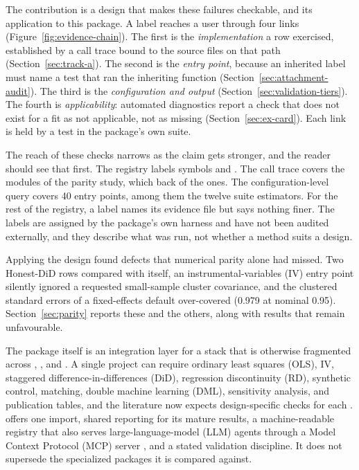 The contribution is a design that makes these failures checkable, and
its application to this package. A label reaches a user through four
links (Figure~\ref{fig:evidence-chain}). The first is the
\emph{implementation} a row exercised, established by a call trace bound
to the source files on that path (Section~\ref{sec:track-a}). The second
is the \emph{entry point}, because an inherited label must name a test
that ran the inheriting function (Section~\ref{sec:attachment-audit}).
The third is the \emph{configuration and output}
(Section~\ref{sec:validation-tiers}). The fourth is
\emph{applicability}: automated diagnostics report a check that does not
exist for a fit as not applicable, not as missing
(Section~\ref{sec:ex-card}). Each link is held by a test in the package's
own suite.

The reach of these checks narrows as the claim gets stronger, and the
reader should see that first. The registry labels
\RegistryCertified{} symbols  and \RegistryValidated{}
. The call trace covers the \RParityModuleCount{} modules
of the parity study, which back \ParityTrackACertifiedCount{} of the
 ones. The configuration-level query covers 40 entry points, among them the twelve suite estimators. For the
rest of the registry, a label names its evidence file but says nothing
finer. The labels are assigned by the package's own harness and have not been
audited externally, and they describe what was run, not whether a method
suits a design.

Applying the design found defects that numerical parity alone had
missed. Two Honest-DiD rows compared  with itself, an
instrumental-variables (IV) entry point silently ignored a requested
small-sample cluster covariance, and the clustered standard errors of a
fixed-effects default over-covered (0.979 at nominal 0.95).
Section~\ref{sec:parity} reports these and the others, along with
results that remain unfavourable.

The package itself is an integration layer for a stack that is otherwise
fragmented across  \citep{statacorp2023stata},
 \citep{rcoreteam2025r}, and 
\citep{vanrossum2009python}. A single project can require ordinary least
squares (OLS), IV, staggered difference-in-differences (DiD), regression
discontinuity (RD), synthetic control, matching, double machine learning
(DML), sensitivity analysis, and publication tables, and the literature
now expects design-specific checks for each
\citep{imbens2009recent,angrist2009mostly,roth2023whats,wing2024designing,baker2026difference}.
\statspai{} offers one import, shared reporting for its mature results, a
machine-readable registry that also serves large-language-model (LLM)
agents through a Model Context Protocol (MCP) server
\citep{mcp2026specification}, and a stated validation discipline. It does
not supersede the specialized packages it is compared against.

